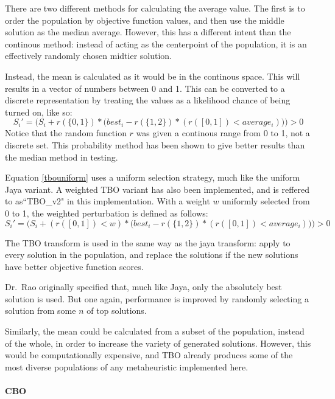 \documentclass[11pt, letterpaper, onecolumn]{article}
\begin{document}
There are two different methods for calculating the average value. The first is to order the population by objective function values, and then use the middle solution as the median average. However, this has a different intent than the continous method: instead of acting as the centerpoint of the population, it is an effectively randomly chosen midtier solution. 

Instead, the mean is calculated as it would be in the continous space. This will results in a vector of numbers between 0 and 1. This can be converted to a discrete representation by treating the values as a likelihood chance of being turned on, like so: 
\begin{equation}\label{tbouniform}
S_i' = \Big(S_i + r(\{0, 1\})*\big(best_i - r(\{1, 2\})*(r([0, 1]) < average_i)\big)\Big) > 0
\end{equation}
Notice that the random function $r$ was given a continous range from 0 to 1, not a discrete set. This probability method has been shown to give better results than the median method in testing. 

Equation \ref{tbouniform} uses a uniform selection strategy, much like the uniform Jaya variant. A weighted TBO variant has also been implemented, and is reffered to as``TBO\_v2" in this implementation. With a weight $w$ uniformly selected from 0 to 1, the weighted perturbation is defined as follows: 
\begin{equation}\label{tbouniform}
S_i' = \Big(S_i + (r([0,1])<w)*\big(best_i - r(\{1, 2\})*(r([0, 1]) < average_i)\big)\Big) > 0
\end{equation}

The TBO transform is used in the same way as the jaya transform: apply to every solution in the population, and replace the solutions if the new solutions have better objective function scores.

Dr.~Rao originally specified that, much like Jaya, only the absolutely best solution is used. But one again, performance is improved by randomly selecting a solution from some $n$ of top solutions. 

Similarly, the mean could be calculated from a subset of the population, instead of the whole, in order to increase the variety of generated solutions. However, this would be computationally expensive, and TBO already produces some of the most diverse populations of any metaheuristic implemented here. 

\paragraph{CBO}
\end{document}
